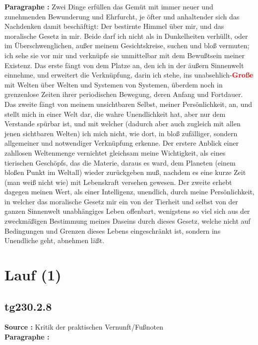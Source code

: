 \documentclass[a4paper,12pt,twoside]{book}
\newcommand{\match}[1]{\textcolor{red}{\textbf{#1}}}
\newcommand{\unnumberedsection}[1]{
	\section*{#1}
	\addcontentsline{toc}{section}{#1}
	\markright{#1}
}
\begin{document}
	\noindent\textbf{Paragraphe : }Zwei Dinge erfüllen das Gemüt mit immer neuer und zunehmenden Bewunderung und Ehrfurcht, je öfter und anhaltender sich das Nachdenken damit beschäftigt: Der bestirnte Himmel über mir, und das moralische Gesetz in mir. Beide darf ich nicht als in Dunkelheiten verhüllt, oder im Überschwenglichen, außer meinem Gesichtskreise, suchen und bloß vermuten; ich sehe sie vor mir und verknüpfe sie unmittelbar mit dem Bewußtsein meiner Existenz. Das erste fängt von dem Platze an, den ich in der äußern Sinnenwelt einnehme, und erweitert die Verknüpfung, darin ich stehe, ins unabsehlich-\match{Große} mit Welten über Welten und Systemen von Systemen, überdem noch in grenzenlose Zeiten ihrer periodischen Bewegung, deren Anfang und Fortdauer. Das zweite fängt von meinem unsichtbaren Selbst, meiner Persönlichkeit, an, und stellt mich in einer Welt dar, die wahre Unendlichkeit hat, aber nur dem Verstande spürbar ist, und mit welcher (dadurch aber auch zugleich mit allen jenen sichtbaren Welten) ich mich nicht, wie dort, in bloß zufälliger, sondern allgemeiner und notwendiger Verknüpfung erkenne. Der erstere Anblick einer zahllosen Weltenmenge vernichtet gleichsam meine Wichtigkeit, als eines tierischen Geschöpfs, das die Materie, daraus es ward, dem Planeten (einem bloßen Punkt im Weltall) wieder zurückgeben muß, nachdem es eine kurze Zeit (man weiß nicht wie) mit Lebenskraft versehen gewesen. Der zweite erhebt dagegen meinen Wert, als einer Intelligenz, unendlich, durch meine Persönlichkeit, in welcher das moralische Gesetz mir ein von der Tierheit und selbst von der ganzen Sinnenwelt unabhängiges Leben offenbart, wenigstens so viel sich aus der zweckmäßigen Bestimmung meines Daseins durch dieses Gesetz, welche nicht auf Bedingungen und Grenzen dieses Lebens eingeschränkt ist, sondern ins Unendliche geht, abnehmen läßt. 
	
	\unnumberedsection{Lauf (1)} 
	\subsection*{tg230.2.8} 
	\textbf{Source : }Kritik der praktischen Vernunft/Fußnoten\\  
	
	\noindent\textbf{Paragraphe : }
	
\end{document}
